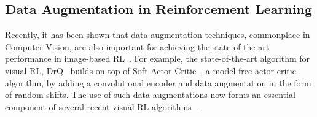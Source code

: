 \subsection{Data Augmentation in Reinforcement Learning}
Recently, it has been shown that data augmentation techniques, commonplace in Computer Vision, are also important for achieving the state-of-the-art performance in image-based RL~\citep{yarats2021image,laskin2020reinforcement}. For example, the state-of-the-art algorithm for visual RL, DrQ~\citep{yarats2021image} builds on top of Soft Actor-Critic~\citep{haarnoja2018sac}, a model-free actor-critic algorithm, by adding a convolutional encoder and data augmentation in the form of random shifts. The use of such data augmentations now forms an essential component of several recent visual RL algorithms~\citep{srinivas2020curl,raileanu2020automatic,yarats2021proto,stooke2020decoupling,hansen2021softda,schwarzer2020spr}. 

